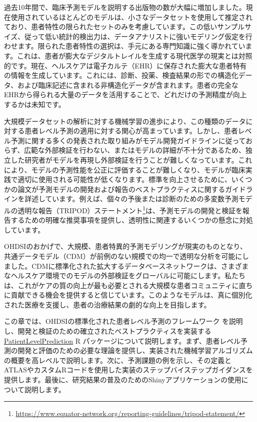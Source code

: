 \documentclass[
  11pt]{book}
\theoremstyle{definition}
\theoremstyle{definition}
\theoremstyle{definition}
\theoremstyle{definition}
\theoremstyle{remark}
\begin{document}
過去10年間で、臨床予測モデルを説明する出版物の数が大幅に増加しました。現在使用されているほとんどのモデルは、小さなデータセットを使用して推定されており、患者特性の限られたセットのみを考慮しています。この低いサンプルサイズ、従って低い統計的検出力は、データアナリストに強いモデリング仮定を行わせます。限られた患者特性の選択は、手元にある専門知識に強く導かれています。これは、患者が膨大なデジタルトレイルを生成する現代医学の現実とは対照的です。現在、ヘルスケアは電子カルテ（EHR）に保存された膨大な患者特有の情報を生成しています。これには、診断、投薬、検査結果の形での構造化データ、および臨床記述に含まれる非構造化データが含まれます。患者の完全なEHRから得られる大量のデータを活用することで、どれだけの予測精度が向上するかは未知です。 

大規模データセットの解析に対する機械学習の進歩により、この種類のデータに対する患者レベル予測の適用に対する関心が高まっています。しかし、患者レベル予測に関する多くの発表された取り組みがモデル開発ガイドラインに従っておらず、広範な外部検証を行わない、またはモデルの詳細が不十分であるため、独立した研究者がモデルを再現し外部検証を行うことが難しくなっています。これにより、モデルの予測性能を公正に評価することが難しくなり、モデルが臨床実践で適切に使用される可能性が低くなります。標準を向上させるために、いくつかの論文が予測モデルの開発および報告のベストプラクティスに関するガイドラインを詳述しています。例えば、個々の予後または診断のための多変数予測モデルの透明な報告（TRIPOD）ステートメント\footnote{\url{https://www.equator-network.org/reporting-guidelines/tripod-statement/}}は、予測モデルの開発と検証を報告するための明確な推奨事項を提供し、透明性に関連するいくつかの懸念に対処しています。  

OHDSIのおかげで、大規模、患者特異的予測モデリングが現実のものとなり、共通データモデル（CDM）が前例のない規模での均一で透明な分析を可能にしました。CDMに標準化された拡大するデータベースネットワークは、さまざまなヘルスケア環境でのモデルの外部検証をグローバルに可能にします。私たちは、これがケアの質の向上が最も必要とされる大規模な患者コミュニティに直ちに貢献できる機会を提供すると信じています。このようなモデルは、真に個別化された医療を支援し、患者の治療結果の劇的な向上を目指します。

この章では、OHDSIの標準化された患者レベル予測のフレームワーク \citep{reps2018}を説明し、開発と検証のための確立されたベストプラクティスを実装する \href{https://ohdsi.github.io/PatientLevelPrediction/}{PatientLevelPrediction} R パッケージについて説明します。まず、患者レベル予測の開発と評価のための必要な理論を提供し、実装された機械学習アルゴリズムの概要を高レベルで説明します。次に、予測課題の例を示し、その定義とATLASやカスタムRコードを使用した実装のステップバイステップガイダンスを提供します。最後に、研究結果の普及のためのShinyアプリケーションの使用について説明します。
\end{document}
